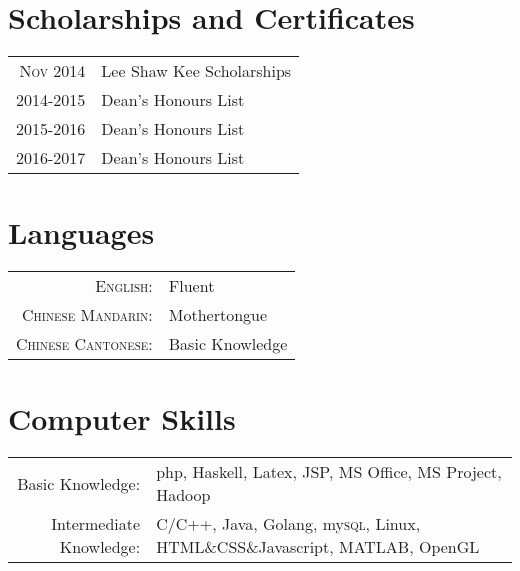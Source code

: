 \documentclass[a4paper,8pt]{article} %
\begin{document}

\section{Scholarships and Certificates}

\begin{tabular}{rl}
\textsc{Nov} 2014 & Lee Shaw Kee Scholarships\\
2014-2015 & Dean's Honours List\\
2015-2016 & Dean's Honours List \\
2016-2017 & Dean's Honours List \\


\end{tabular}

\section{Languages}

\begin{tabular}{rl}
\textsc{English:} & Fluent\\

\textsc{Chinese Mandarin:} & Mothertongue\\

\textsc{Chinese Cantonese:} & Basic Knowledge\\
\end{tabular}


\section{Computer Skills}

\begin{tabular}{rl}
Basic Knowledge: & php, Haskell, Latex, JSP, MS Office, MS Project, Hadoop\\

Intermediate Knowledge: &  C/C++, Java, Golang, my\textsc{sql}, Linux, HTML\&CSS\&Javascript, MATLAB, OpenGL  \\
\end{tabular}
\end{document}
